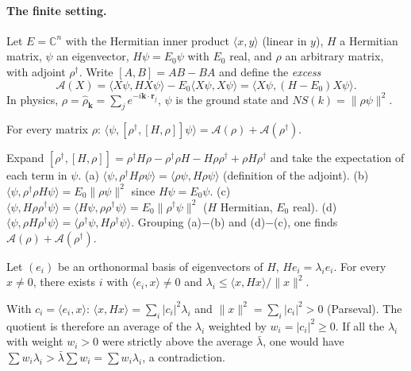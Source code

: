 \paragraph{The finite setting.} Let $E=\mathbb{C}^n$ with the Hermitian inner product $\langle x,y\rangle$ (linear in
$y$), $H$ a Hermitian matrix, $\psi$ an eigenvector, $H\psi=E_0\psi$ with $E_0$ real, and $\rho$ an arbitrary matrix,
with adjoint $\rho^\dagger$. Write $[A,B]=AB-BA$ and define the \emph{excess}
\[
\mathcal A(X)=\langle X\psi,HX\psi\rangle-E_0\langle X\psi,X\psi\rangle=\langle X\psi,(H-E_0)X\psi\rangle .
\]
In physics, $\rho=\hat\rho_{\mathbf k}=\sum_je^{-i\mathbf k\cdot\mathbf r_j}$, $\psi$ is the ground state and
$NS(k)=\|\rho\psi\|^2$.

\begin{lemma}\label{ch3:lem:dc}
For every matrix $\rho$: $\langle\psi,[\rho^\dagger,[H,\rho]]\psi\rangle=\mathcal A(\rho)+\mathcal A(\rho^\dagger)$. \tierAs
\end{lemma}
\begin{humanproof}
Expand $[\rho^\dagger,[H,\rho]]=\rho^\dagger H\rho-\rho^\dagger\rho H-H\rho\rho^\dagger+\rho H\rho^\dagger$ and
take the expectation of each term in $\psi$.
(a) $\langle\psi,\rho^\dagger H\rho\psi\rangle=\langle\rho\psi,H\rho\psi\rangle$ (definition of the adjoint).
(b) $\langle\psi,\rho^\dagger\rho H\psi\rangle=E_0\|\rho\psi\|^2$ since $H\psi=E_0\psi$.
(c) $\langle\psi,H\rho\rho^\dagger\psi\rangle=\langle H\psi,\rho\rho^\dagger\psi\rangle=E_0\|\rho^\dagger\psi\|^2$
($H$ Hermitian, $E_0$ real).
(d) $\langle\psi,\rho H\rho^\dagger\psi\rangle=\langle\rho^\dagger\psi,H\rho^\dagger\psi\rangle$.
Grouping (a)$-$(b) and (d)$-$(c), one finds $\mathcal A(\rho)+\mathcal A(\rho^\dagger)$.
\end{humanproof}

\begin{lemma}\label{ch3:lem:rayleigh}
Let $(e_i)$ be an orthonormal basis of eigenvectors of $H$, $He_i=\lambda_ie_i$. For every $x\ne0$, there exists $i$ with
$\langle e_i,x\rangle\neq0$ and $\lambda_i\le\langle x,Hx\rangle/\|x\|^2$. \tierAs
\end{lemma}
\begin{humanproof}
With $c_i=\langle e_i,x\rangle$: $\langle x,Hx\rangle=\sum_i|c_i|^2\lambda_i$ and $\|x\|^2=\sum_i|c_i|^2>0$ (Parseval). The
quotient is therefore an average of the $\lambda_i$ weighted by $w_i=|c_i|^2\ge0$. If all the $\lambda_i$ with weight
$w_i>0$ were strictly above the average $\bar\lambda$, one would have $\sum w_i\lambda_i>\bar\lambda\sum w_i=\sum
w_i\lambda_i$, a contradiction.
\end{humanproof}

